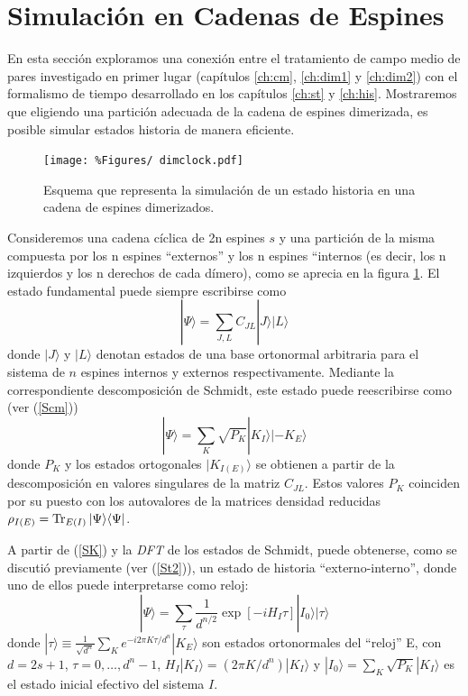 \section{Simulación en Cadenas de Espines}

En esta sección exploramos una conexión entre el tratamiento de campo medio de pares investigado en primer lugar (capítulos \ref{ch:cm}, \ref{ch:dim1} y \ref{ch:dim2}) con el formalismo de tiempo desarrollado en los capítulos \ref{ch:st} y \ref{ch:his}. Mostraremos que eligiendo una partición adecuada de la cadena de espines dimerizada, es posible simular estados historia de manera eficiente.

\begin{figure}[htp]
\centering
\texttt{[image: \%Figures/
dimclock.pdf]}
\caption{Esquema que representa la simulación de un estado historia en una cadena de espines dimerizados.} 
\label{fig:dimerclock}
\end{figure}

Consideremos una cadena cíclica de 2n espines $s$ y una partición de la misma compuesta por los n espines ``externos'' y los n espines ``internos (es decir, los n izquierdos y los n derechos de cada dímero), como se aprecia en la figura \ref{fig:dimerclock}. El estado fundamental puede siempre escribirse 
como 
\begin{equation}
    |\Psi\rangle=\sum_{J,L}C_{JL}|J\rangle|L\rangle
\end{equation}
donde $|J\rangle$ y $|L\rangle$ denotan estados de una base ortonormal arbitraria para el sistema de $n$ espines internos y externos respectivamente. Mediante la correspondiente descomposición de Schmidt, este estado puede reescribirse  como (ver (\ref{Scm})) 
\begin{equation}|\Psi\rangle=\sum_K  \sqrt{P_K}|K_I\rangle|-K_E\rangle\label{SK}\end{equation}
donde $P_K$ y los estados ortogonales  $|K_{I(E)}\rangle$ se obtienen a partir de la descomposición en valores singulares de  la matriz $C_{JL}$. Estos valores $P_K$ coinciden por su puesto con los autovalores de la matrices densidad reducidas $\rho_{I(E)}={\rm Tr}_{E(I)}\,|\Psi\rangle\langle\Psi|$. 

A partir de (\ref{SK}) y la {\it DFT} de los estados de Schmidt, puede obtenerse,  como se discutió previamente (ver (\ref{St2})),  un estado de historia ``externo-interno'', donde uno de ellos puede interpretarse como reloj:
\begin{equation}
    |\Psi\rangle=\sum_{\tau}\frac{1}{d^{n/2}}\exp[-iH_I\tau]|I_0\rangle
    |\tau\rangle
\end{equation}
donde $|\tau\rangle\equiv\frac{1}{\sqrt{d^n}}\sum_K e^{-i2\pi K\tau/d^n}|K_E\rangle$   son estados ortonormales del ``reloj'' E, con $d=2s+1$,  $\tau=0,\ldots,d^n-1$,  $H_I|K_I\rangle=(2\pi K/d^n)|K_I\rangle$ y 
$|I_0\rangle=\sum_K\sqrt{P_K}|K_I\rangle$ es el estado inicial efectivo del sistema $I$.  


